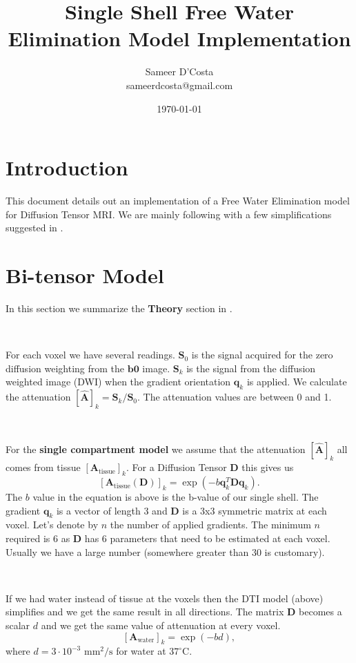 \documentclass[12pt]{article}
\title{Single Shell Free Water Elimination Model Implementation
}
\author{
  Sameer D'Costa \\
    sameerdcosta@gmail.com
}
\date{\today}
\newcommand{\vect}[1]{\mathbf{#1}}
\newcommand{\Ahat}{\hat{\vect{A}}}
\newcommand{\Atissue}{\vect{A}_{\text{tissue}}}
\newcommand{\Awater}{\vect{A}_{\text{water}}}
\begin{document}
\maketitle

\section{Introduction}
This document details out an implementation of a Free Water Elimination model
for Diffusion Tensor MRI. We are mainly following \cite{Pasternak2009} with a
few simplifications suggested in \cite{Pasternak2014}.

\section{Bi-tensor Model}
In this section we summarize the \textbf{Theory} section in
\cite{Pasternak2009}. 

\ 

\noindent
For each voxel we have several readings. $\vect{S}_0$ is the signal acquired
for the zero diffusion weighting from the $\vect{b0}$ image. $\vect{S}_k$ is
the signal from the diffusion weighted image (DWI) when the gradient
orientation $\vect{q}_k$ is applied. We calculate the attenuation
$[\hat{\vect{A}}]_k = \vect{S}_k / \vect{S}_0$. The attenuation values are
between 0 and 1. 

\ 

\noindent
For the \textbf{single compartment model} we assume that the attenuation
$[\Ahat]_k$ all comes from tissue $[\Atissue]_k$. For a Diffusion Tensor
$\vect{D}$ this gives us 
$$[\Atissue(\vect{D})]_k = \exp(-b \vect{q}_k^T\vect{D}\vect{q}_k).$$
The $b$ value in the equation is above is the b-value of our single shell. The
gradient $\vect{q}_k$ is a vector of length 3 and $\vect{D}$ is a 3x3 symmetric
matrix at each voxel. Let's denote by $n$ the number of applied gradients.  The
minimum $n$ required is 6 as $\vect{D}$ has 6 parameters that need to be
estimated at each voxel. Usually we have a large number (somewhere greater than 30 is customary).


\ 

\noindent
If we had water instead of tissue at the voxels then the DTI model (above)
simplifies and we get the same result in all directions. The matrix $\vect{D}$
becomes a scalar $d$ and we get the same value of attenuation at every voxel.
$$[\Awater]_k = \exp(-bd),$$
where $d = 3 \cdot 10^{-3}$ $\text{mm}^2/\text{s}$ for water at $37^\circ$C. 
\end{document}
